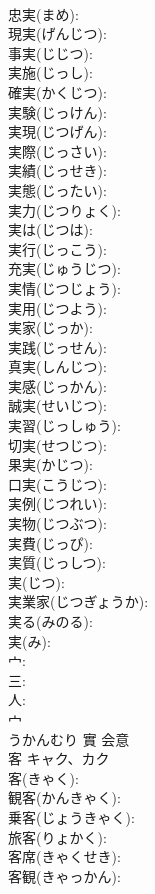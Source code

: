 \documentclass[8pt]{extreport}
\begin{document}
\begin{CJK}{UTF8}{min}
\\	忠実(まめ): 
\\	現実(げんじつ): 
\\	事実(じじつ): 
\\	実施(じっし): 
\\	確実(かくじつ): 
\\	実験(じっけん): 
\\	実現(じつげん): 
\\	実際(じっさい): 
\\	実績(じっせき): 
\\	実態(じったい): 
\\	実力(じつりょく): 
\\	実は(じつは): 
\\	実行(じっこう): 
\\	充実(じゅうじつ): 
\\	実情(じつじょう): 
\\	実用(じつよう): 
\\	実家(じっか): 
\\	実践(じっせん): 
\\	真実(しんじつ): 
\\	実感(じっかん): 
\\	誠実(せいじつ): 
\\	実習(じっしゅう): 
\\	切実(せつじつ): 
\\	果実(かじつ): 
\\	口実(こうじつ): 
\\	実例(じつれい): 
\\	実物(じつぶつ): 
\\	実費(じっぴ): 
\\	実質(じっしつ): 
\\	実(じつ): 
\\	実業家(じつぎょうか): 
\\	実る(みのる): 
\\	実(み): 
\\	宀: 
\\	三: 
\\	人: 
\\	宀	
\\	うかんむり	實	会意 
\\	客	キャク、カク			
\\	客(きゃく): 
\\	観客(かんきゃく): 
\\	乗客(じょうきゃく): 
\\	旅客(りょかく): 
\\	客席(きゃくせき): 
\\	客観(きゃっかん): 

\end{CJK}
\end{document}
